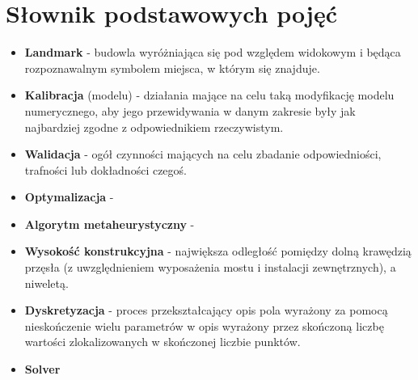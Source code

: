 \chapter*{Słownik podstawowych pojęć}
\begin{itemize}[label = {},leftmargin=*]
\item \textbf{Landmark} - budowla wyróżniająca się pod względem widokowym i będąca rozpoznawalnym symbolem miejsca, w którym się znajduje.
\item \textbf{Kalibracja} (modelu) - działania mające na celu taką modyfikację modelu numerycznego, aby jego przewidywania w danym zakresie były jak najbardziej zgodne z odpowiednikiem rzeczywistym.
\item \textbf{Walidacja} - ogół czynności mających na celu zbadanie odpowiedniości, trafności lub dokładności czegoś.
\item \textbf{Optymalizacja} - 
\item \textbf{Algorytm metaheurystyczny} -
\item \textbf{Wysokość konstrukcyjna} - największa odległość pomiędzy dolną krawędzią przęsła (z uwzględnieniem wyposażenia mostu i instalacji zewnętrznych), a niweletą.
\item \textbf{Dyskretyzacja} - proces przekształcający opis pola wyrażony za pomocą nieskończenie wielu parametrów w opis wyrażony przez skończoną liczbę wartości zlokalizowanych w skończonej liczbie punktów.
\item \textbf{Solver}
\end{itemize}